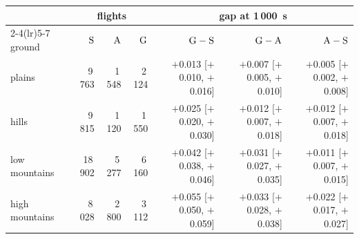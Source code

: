 \begin{tabular}{@{}l r r r r r r@{}}
\toprule
 & \multicolumn{3}{c}{flights} & \multicolumn{3}{c}{gap at 1\,000~s} \\
\cmidrule(lr){2-4}\cmidrule(lr){5-7}
ground & $\mathrm{S}$ & $\mathrm{A}$ & $\mathrm{G}$ & $\mathrm{G}-\mathrm{S}$ & $\mathrm{G}-\mathrm{A}$ & $\mathrm{A}-\mathrm{S}$ \\
\midrule
plains & 9\,763 & 1\,548 & 2\,124 & $+$0.013 [$+$0.010, $+$0.016] & $+$0.007 [$+$0.005, $+$0.010] & $+$0.005 [$+$0.002, $+$0.008] \\
hills & 9\,815 & 1\,120 & 1\,550 & $+$0.025 [$+$0.020, $+$0.030] & $+$0.012 [$+$0.007, $+$0.018] & $+$0.012 [$+$0.007, $+$0.018] \\
low mountains & 18\,902 & 5\,277 & 6\,160 & $+$0.042 [$+$0.038, $+$0.046] & $+$0.031 [$+$0.027, $+$0.035] & $+$0.011 [$+$0.007, $+$0.015] \\
high mountains & 8\,028 & 2\,800 & 3\,112 & $+$0.055 [$+$0.050, $+$0.059] & $+$0.033 [$+$0.028, $+$0.038] & $+$0.022 [$+$0.017, $+$0.027] \\
\bottomrule
\end{tabular}
